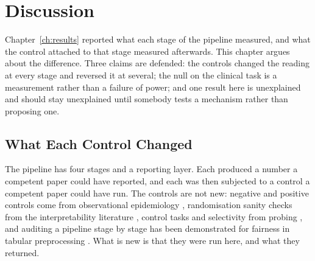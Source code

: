 %

\chapter{Discussion}
\label{ch:discussion}

Chapter~\ref{ch:results} reported what each stage of the pipeline measured, and
what the control attached to that stage measured afterwards. This chapter argues
about the difference. Three claims are defended: the controls changed the reading
at every stage and reversed it at several; the null on the clinical task is a
measurement rather than a failure of power; and one result here is unexplained
and should stay unexplained until somebody tests a mechanism rather than
proposing one.

\section{What Each Control Changed}
\label{sec:disc-spine}

The pipeline has four stages and a reporting layer. Each produced a number a
competent paper could have reported, and each was then subjected to a control a
competent paper could have run. The controls are not new: negative and positive
controls come from observational epidemiology \citep{lipsitch2010negative},
randomisation sanity checks from the interpretability literature
\citep{adebayo2018sanity}, control tasks and selectivity from probing
\citep{hewitt2019control}, and auditing a pipeline stage by stage has been
demonstrated for fairness in tabular preprocessing
\citep{biswas2021fairpreprocessing}. What is new is that they were run here, and
what they returned.

